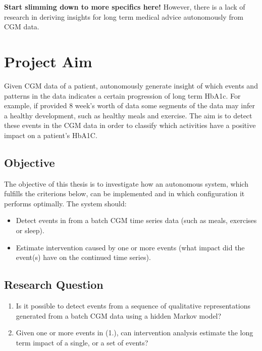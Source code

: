 \textbf{Start slimming down to more specifics here!}
However, there is a lack of research in deriving insights for long term medical advice autonomously from CGM data.

\section{Project Aim}

Given CGM data of a patient, autonomously generate insight of which events and patterns in the data indicates a certain progression of long term HbA1c.
For example, if provided 8 week's worth of data some segments of the data may infer a healthy development, such as healthy meals and exercise.
The aim is to detect these events in the CGM data in order to classify which activities have a positive impact on a patient's HbA1C.

\subsection{Objective}

The objective of this thesis is to investigate how an autonomous system, which fulfills the criterions below, can be implemented and in which configuration it performs optimally. The system should:
\begin{itemize}
  \item Detect events in from a batch CGM time series data (such as meals, exercises or sleep).
  \item Estimate intervention caused by one or more events (what impact did the event(s) have on the continued time series).
\end{itemize}

\subsection{Research Question}

\begin{enumerate}
  \item Is it possible to detect events from a sequence of qualitative representations generated from a batch CGM data using a hidden Markov model?
  \item Given one or more events in (1.), can intervention analysis estimate the long term impact of a single, or a set of events?
\end{enumerate}
